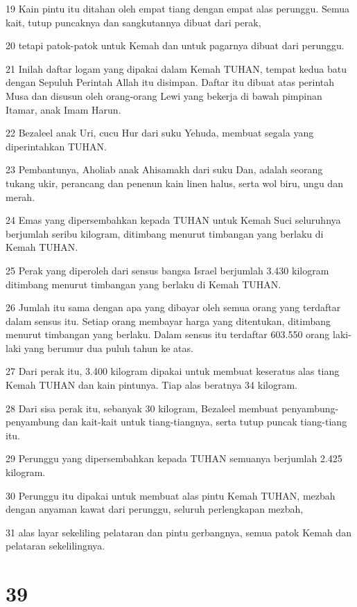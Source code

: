 \par 19 Kain pintu itu ditahan oleh empat tiang dengan empat alas perunggu. Semua kait, tutup puncaknya dan sangkutannya dibuat dari perak,
\par 20 tetapi patok-patok untuk Kemah dan untuk pagarnya dibuat dari perunggu.
\par 21 Inilah daftar logam yang dipakai dalam Kemah TUHAN, tempat kedua batu dengan Sepuluh Perintah Allah itu disimpan. Daftar itu dibuat atas perintah Musa dan disusun oleh orang-orang Lewi yang bekerja di bawah pimpinan Itamar, anak Imam Harun.
\par 22 Bezaleel anak Uri, cucu Hur dari suku Yehuda, membuat segala yang diperintahkan TUHAN.
\par 23 Pembantunya, Aholiab anak Ahisamakh dari suku Dan, adalah seorang tukang ukir, perancang dan penenun kain linen halus, serta wol biru, ungu dan merah.
\par 24 Emas yang dipersembahkan kepada TUHAN untuk Kemah Suci seluruhnya berjumlah seribu kilogram, ditimbang menurut timbangan yang berlaku di Kemah TUHAN.
\par 25 Perak yang diperoleh dari sensus bangsa Israel berjumlah 3.430 kilogram ditimbang menurut timbangan yang berlaku di Kemah TUHAN.
\par 26 Jumlah itu sama dengan apa yang dibayar oleh semua orang yang terdaftar dalam sensus itu. Setiap orang membayar harga yang ditentukan, ditimbang menurut timbangan yang berlaku. Dalam sensus itu terdaftar 603.550 orang laki-laki yang berumur dua puluh tahun ke atas.
\par 27 Dari perak itu, 3.400 kilogram dipakai untuk membuat keseratus alas tiang Kemah TUHAN dan kain pintunya. Tiap alas beratnya 34 kilogram.
\par 28 Dari sisa perak itu, sebanyak 30 kilogram, Bezaleel membuat penyambung-penyambung dan kait-kait untuk tiang-tiangnya, serta tutup puncak tiang-tiang itu.
\par 29 Perunggu yang dipersembahkan kepada TUHAN semuanya berjumlah 2.425 kilogram.
\par 30 Perunggu itu dipakai untuk membuat alas pintu Kemah TUHAN, mezbah dengan anyaman kawat dari perunggu, seluruh perlengkapan mezbah,
\par 31 alas layar sekeliling pelataran dan pintu gerbangnya, semua patok Kemah dan pelataran sekelilingnya.

\chapter{39}

